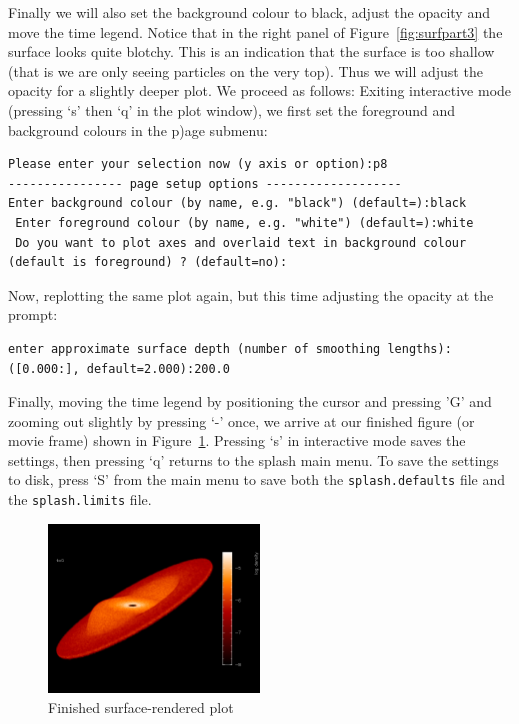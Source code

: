 \documentclass[a4paper,11pt]{article}
\begin{document}
Finally we will also set the background colour to black, adjust the opacity and move the time legend. 
Notice that in the right panel of Figure~\ref{fig:surfpart3} the surface looks quite blotchy. This is an indication that the surface is too shallow (that is we are only seeing particles on the very top). Thus we will adjust the opacity for a slightly deeper plot. We proceed as follows: Exiting interactive mode (pressing `s' then `q' in the plot window), we first set the foreground and background colours in the p)age submenu:
\begin{verbatim}
Please enter your selection now (y axis or option):p8
---------------- page setup options -------------------
Enter background colour (by name, e.g. "black") (default=):black
 Enter foreground colour (by name, e.g. "white") (default=):white
 Do you want to plot axes and overlaid text in background colour (default is foreground) ? (default=no):
\end{verbatim}
Now, replotting the same plot again, but this time adjusting the opacity at the prompt:
\begin{verbatim}
enter approximate surface depth (number of smoothing lengths): ([0.000:], default=2.000):200.0
\end{verbatim}
 Finally, moving the time legend by positioning the cursor and pressing 'G' and zooming out slightly by pressing `-' once, we arrive at our finished figure (or movie frame) shown in Figure~\ref{fig:surfpartfinal}. Pressing `s' in interactive mode saves the settings, then pressing `q' returns to the splash main menu. To save the settings to disk, press `S' from the main menu to save both the \verb+splash.defaults+ file and the \verb+splash.limits+ file.
\begin{figure}[h!]
\begin{center}
\includegraphics[width=0.5\textwidth]{surfpartfinal.png}
\caption{Finished surface-rendered plot}
\label{fig:surfpartfinal}
\end{center}
\end{figure}
 
\end{document}
